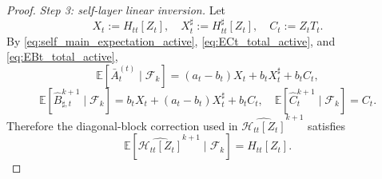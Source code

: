 \documentclass{pkumelon}
\theoremstyle{plain}
\newcommand{\E}{\mathbb{E}}
\begin{document}
\begin{proof}
\emph{Step 3: self-layer linear inversion.} Let
\begin{equation*}
X_t:=H_{tt}[Z_t],\quad X_t^\sharp:=H_{tt}^\sharp[Z_t],\quad C_t:=Z_tT_t.
\end{equation*}
By \eqref{eq:self_main_expectation_active}, \eqref{eq:ECt_total_active}, and \eqref{eq:EBt_total_active},
\begin{equation*}
\E[\bar A_t^{(t)}\mid \mathcal F_k] = (a_t-b_t)X_t+b_t X_t^\sharp+b_t C_t,
\end{equation*}
\begin{equation*}
\E[\widehat B_{\sharp,t}^{k+1}\mid \mathcal F_k] = b_t X_t+(a_t-b_t)X_t^\sharp+b_t C_t, \quad \E[\widehat C_t^{k+1}\mid \mathcal F_k]=C_t.
\end{equation*}
Therefore the diagonal-block correction used in $\widehat{\mathcal H_{tt}[Z_t]}^{k+1}$ satisfies
\begin{equation}\label{eq:self_corrected_unbiased_active}
\E[\widehat{\mathcal H_{tt}[Z_t]}^{k+1}\mid \mathcal F_k]=H_{tt}[Z_t].
\end{equation}


\end{proof}
\end{document}
